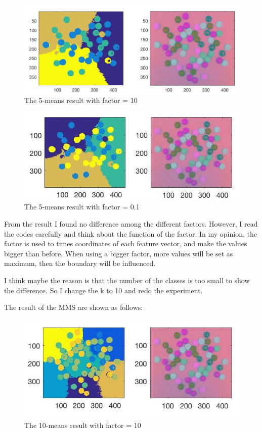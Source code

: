 \documentclass{article}
\begin{document}
\begin{figure}[htbp]
    \centering
    \includegraphics[scale = 0.25]{fig14.jpg}
    \caption{The 5-means result with factor = 10}
    \label{fig14}
\end{figure}

\begin{figure}[htbp]
    \centering
    \includegraphics[scale = 0.4]{fig15.jpg}
    \caption{The 5-means result with factor = 0.1}
    \label{fig15}
\end{figure}

From the result I found no difference among the different factors. However, I read the codes carefully and think about the function of the factor. In my opinion, the factor is used to times coordinates of each feature vector, and make the values bigger than before. When using a bigger factor, more values will be set as maximum, then the boundary will be influenced. 

I think maybe the reason is that the number of the classes is too small to show the difference. So I change the k to 10 and redo the experiment.

The result of the MMS are shown as follows:
\begin{figure}[htbp]
    \centering
    \includegraphics[scale = 0.4]{fig16_10.jpg}
    \caption{The 10-means result with factor = 10}
    \label{fig16}
\end{figure}
\end{document}
